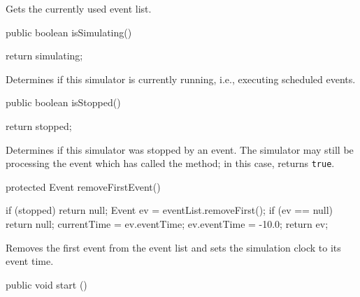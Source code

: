\begin{tabb}  Gets the currently used event list.
\end{tabb}
\begin{htmlonly}
\end{htmlonly}
\begin{code}

   public boolean isSimulating()\begin{hide} {
       return simulating;
   }\end{hide}
\end{code}
\begin{tabb}  Determines if this simulator is currently running, i.e.,
  executing scheduled events.
\end{tabb}
\begin{code}

   public boolean isStopped()\begin{hide} {
       return stopped;
   }\end{hide}
\end{code}
\begin{tabb}  Determines if this simulator was stopped by
  an event.  The simulator may still be processing the event which
  has called the  method; in this case,
   returns \texttt{true}.
\end{tabb}
\begin{code}

   protected Event removeFirstEvent()\begin{hide} {
       if (stopped)
          return null;
       Event ev = eventList.removeFirst();
       if (ev == null)
          return null;
       currentTime = ev.eventTime;
       ev.eventTime = -10.0;
       return ev;
   }\end{hide}
\end{code}
\begin{tabb}  Removes the first event from the event list and sets the simulation
  clock to its event time.
\end{tabb}
\begin{htmlonly}
\end{htmlonly}
\begin{code}

   public void start () \begin{hide} {
      if (eventList.isEmpty())
        throw new IllegalStateException ("start() called with an empty event list");
      stopped = false;
      simulating = true;
      Event ev;
      try {
         while ((ev = removeFirstEvent()) != null && !stopped) {
   //      while (!stopped && (ev = eventList.removeFirst()) != null) {
   //          currentTime = ev.eventTime;
   //          ev.eventTime = -10.0;
             ev.actions();
             // if ev is a thread object associated to a process,
             // the control will be transfered to this thread and the
             // executive will be passivated in the actions() method.
         }
      }
      finally {
         stopped = true; simulating = false;
      }
   }\end{hide}
\end{code}
